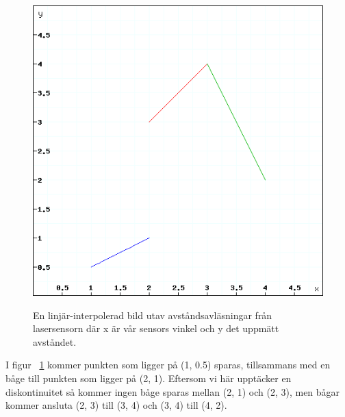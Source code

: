 \documentclass{article}
\begin{document}
\begin{figure}[H]
  \centering
  \includegraphics[scale=0.5]{Laserfunktionskurva} \\
  \caption{En linjär-interpolerad bild utav avståndsavläsningar från lasersensorn där x är vår sensors vinkel och y det uppmätt avståndet.}
  \label{fig:laserfunktionskurva}
\end{figure}

I figur ~\ref{fig:laserfunktionskurva} kommer punkten som ligger på (1, 0.5) sparas, tillsammans med en båge till punkten som ligger på (2, 1). Eftersom vi här upptäcker en diskontinuitet så kommer ingen båge sparas mellan (2, 1) och (2, 3), men bågar kommer ansluta (2, 3) till (3, 4) och (3, 4) till (4, 2).
\end{document}
